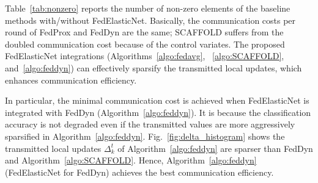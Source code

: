 \documentclass{article} %
\begin{document}
Table~\ref{tab:nonzero} reports the number of non-zero elements of the baseline methods with/without FedElasticNet. Basically, the communication costs per round of FedProx and FedDyn are the same; SCAFFOLD suffers from the doubled communication cost because of the control variates. The proposed FedElasticNet integrations (Algorithms~\ref{algo:fedavg}, ~\ref{algo:SCAFFOLD}, and~\ref{algo:feddyn}) can effectively sparsify the transmitted local updates, which enhances communication efficiency. %

In particular, the minimal communication cost is achieved when FedElasticNet is integrated with FedDyn (Algorithm~\ref{algo:feddyn}). It is because the classification accuracy is not degraded even if the transmitted values are more aggressively sparsified in Algorithm~\ref{algo:feddyn}. Fig.~\ref{fig:delta_histogram} shows the transmitted local updates $\Delta_k^t$ of Algorithm~\ref{algo:feddyn} are sparser than FedDyn and Algorithm~\ref{algo:SCAFFOLD}. Hence, Algorithm~\ref{algo:feddyn} (FedElasticNet for FedDyn) achieves the best communication efficiency. 






\end{document}
